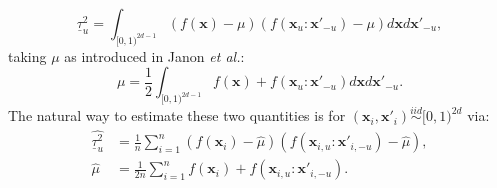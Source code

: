 \documentclass[]{elsarticle}
\theoremstyle{definition}
\newcommand{\bvec}[1]{\boldsymbol{#1}}
\newcommand{\vx}{\bvec{x}}
\begin{document}
\begin{equation}\label{first_order_indice}
\underline{\tau}_u^2  =\int_{[0,1)^{2d-1}}(f(\vx) - \mu) (f(\vx_u:{\vx'}_{-u})-\mu) d\vx d{\vx'}_{-u},
\end{equation}
taking $\mu$ as introduced in Janon \textit{et al.}:
\[\mu= \frac{1}{2} \int_{[0,1)^{2d-1}}f(\vx)+f(\vx_u:{\vx'}_{-u}) d\vx d{\vx'}_{-u}. \]
The natural way to estimate these two quantities is for $(\vx_i,\vx'_i) \stackrel{iid}{\sim} [0,1)^{2d}$ via:
\begin{align}
\widehat{\underline{\tau}_u^2} & = \frac{1}{n} \sum \limits_{i=1}^n (f(\vx_i) - \widehat{\mu}) (f(\vx_{i,u}:{\vx'}_{i,-u})-\widehat{\mu}),\label{first_order_indice_estimator}\\
\nonumber
\widehat{\mu} & = \frac{1}{2n} \sum \limits_{i=1}^n f(\vx_i) +f(\vx_{i,u}:{\vx'}_{i,-u}).
\end{align}
\bigskip
\end{document}
